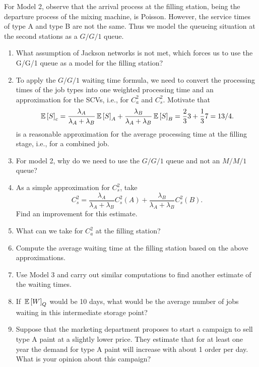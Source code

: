 \begin{question}[use=false]
For Model 2, observe that the arrival process at the filling station,
being the departure process of the mixing machine, is
Poisson. However, the service times of type A and type B are not the
same. Thus we model the queueing situation at the second stations as a
$G/G/1$ queue.
  \begin{enumerate}[resume]
  \item   What assumption of Jackson networks is not met, which forces us to
  use the G/G/1 queue as a model for the filling station?
\item To apply the $G/G/1$ waiting time formula, we need to convert
  the processing times of the job types into one weighted processing
  time and an approximation for the SCVs, i.e., for $C_a^2$ and
  $C_s^2$.  Motivate that
  \begin{equation*}
\,\mathbb{E}\left[S\right]_c = \frac{\lambda_A}{\lambda_A + \lambda_B} \,\mathbb{E}\left[S\right]_A + \frac{\lambda_B}{\lambda_A + \lambda_B} \,\mathbb{E}\left[S\right]_B = \frac23 3 + \frac13 7= 13/4.
  \end{equation*}
  is a reasonable approximation for the average processing time at the
  filling stage, i.e., for a combined job.
\item For model 2, why do we need to use the $G/G/1$ queue and not an
  $M/M/1$ queue?
\item As a simple approximation for $C_s^2$, take
  \begin{equation*}
  C_s^2 = 
\frac{\lambda_A}{\lambda_A + \lambda_B} C_s^2(A) +
  \frac{\lambda_B}{\lambda_A + \lambda_B} C_s^2(B).
  \end{equation*}
  Find an improvement for this estimate.
\item What can we take for $C_a^2$ at the filling station?
\item Compute the average waiting time at the filling station based on
  the above approximations.
\item Use Model 3 and carry out similar computations to find another
  estimate of the waiting times.
  \item If  $\,\mathbb{E}\left[W\right]_Q$ would be 10 days, what would be the average
    number of jobs waiting in this intermediate storage point?
\item Suppose that the marketing department proposes to start a
  campaign to sell type A paint at a slightly lower price. They
  estimate that for at least one year the demand for type A paint will
  increase with about 1 order per day. What is your opinion about this
  campaign?
\end{enumerate}


\end{question}
